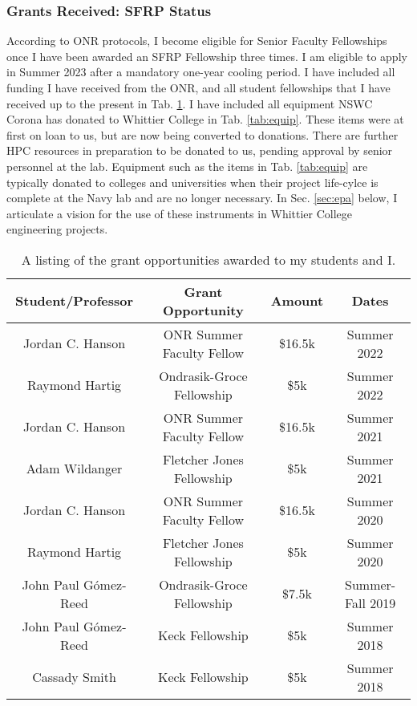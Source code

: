 \documentclass[../../../main.tex]{subfiles}
\begin{document}
\subsubsection{Grants Received: SFRP Status}

According to ONR protocols, I become eligible for Senior Faculty Fellowships once I have been awarded an SFRP Fellowship three times.  I am eligible to apply in Summer 2023 after a mandatory one-year cooling period.  I have included all funding I have received from the ONR, and all student fellowships that I have received up to the present in Tab. \ref{tab:funds}.  I have included all equipment NSWC Corona has donated to Whittier College in Tab. \ref{tab:equip}.  These items were at first on loan to us, but are now being converted to donations.  There are further HPC resources in preparation to be donated to us, pending approval by senior personnel at the lab.  Equipment such as the items in Tab. \ref{tab:equip} are typically donated to colleges and universities when their project life-cylce is complete at the Navy lab and are no longer necessary.  In Sec. \ref{sec:epa} below, I articulate a vision for the use of these instruments in Whittier College engineering projects.

\begin{table}
\centering
\begin{tabular}{c c c c}
Student/Professor & Grant Opportunity & Amount & Dates \\ \hline
Jordan C. Hanson & ONR Summer Faculty Fellow & \$16.5k & Summer 2022 \\
Raymond Hartig & Ondrasik-Groce Fellowship & \$5k & Summer 2022 \\
Jordan C. Hanson & ONR Summer Faculty Fellow & \$16.5k & Summer 2021 \\
Adam Wildanger & Fletcher Jones Fellowship & \$5k & Summer 2021 \\
Jordan C. Hanson & ONR Summer Faculty Fellow & \$16.5k & Summer 2020 \\
Raymond Hartig & Fletcher Jones Fellowship & \$5k & Summer 2020 \\
John Paul G\'{o}mez-Reed & Ondrasik-Groce Fellowship & \$7.5k & Summer-Fall 2019 \\
John Paul G\'{o}mez-Reed & Keck Fellowship & \$5k & Summer 2018 \\
Cassady Smith & Keck Fellowship & \$5k & Summer 2018 \\
\end{tabular}
\caption{\label{tab:funds} A listing of the grant opportunities awarded to my students and I.}
\end{table}
\end{document}
